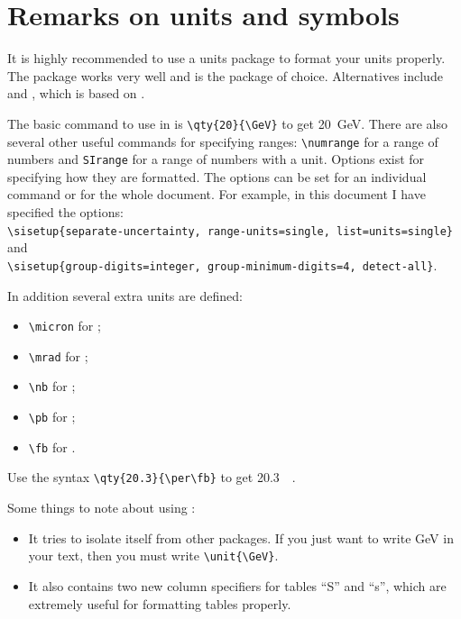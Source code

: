 \section{Remarks on units and symbols}%
\label{sec:siunitx}

It is highly recommended to use a units package to format your units properly.
The package  works very well and is the package of choice.
Alternatives include  and ,
which is based on .

The basic command to use in  is \verb|\qty{20}{\GeV}| to get
\qty{20}{\GeV}. 
There are also several other useful commands for specifying ranges:
\verb|\numrange| for a range of numbers and \verb|SIrange| for a range of numbers with a unit. 
Options exist for specifying how they are formatted.
The options can be set for an individual command or for the whole document.
For example, in this document I have specified the options:\\
\verb|\sisetup{separate-uncertainty, range-units=single, list=units=single}|
and\\
\verb|\sisetup{group-digits=integer, group-minimum-digits=4, detect-all}|.

In addition several extra units are defined:
\begin{itemize}
\item \verb|\micron| for \unit{\micron};
\item \verb|\mrad| for \unit{\mrad};
\item \verb|\nb| for \unit{\nb};
\item \verb|\pb| for \unit{\pb};
\item \verb|\fb| for \unit{\fb}.
\end{itemize}
Use the syntax \verb|\qty{20.3}{\per\fb}| to get \qty{20.3}{\per\fb}.

Some things to note about using :
\begin{itemize}
\item It tries to isolate itself from other packages.
  If you just want to write \unit{\GeV} in your text,
  then you must write \verb|\unit{\GeV}|.
\item It also contains two new column specifiers for tables ``S'' and ``s'',
  which are extremely useful for formatting tables properly.
\end{itemize}

